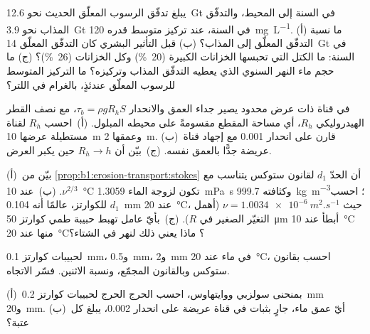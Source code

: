 \begin{exercise}[$\star$]\label{exo:b1:erosion-transport:4}
يبلغ تدفّق الرسوب المعلّق الحديث نحو \qty{12.6}{Gt} في السنة إلى المحيط، والتدفّق المذاب نحو \qty{3.9}{Gt} في السنة، عند تركيز متوسط قدره \qty{120}{mg.L^{-1}}. (أ) ما نسبة التدفّق المعلّق إلى المذاب؟ (ب) قبل التأثير البشري كان التدفّق المعلّق \qty{14}{Gt} في السنة: ما الكتل التي تحبسها الخزانات الكبيرة (\qty{20}{\percent}) وكل الخزانات (\qty{26}{\percent})؟ (ج) ما حجم ماء النهر السنوي الذي يعطيه التدفّق المذاب وتركيزه؟ ما التركيز المتوسط للرسوب المعلّق عندئذٍ، بالغرام في اللتر؟
\end{exercise}

\begin{exercise}[$\star\star$]\label{exo:b1:erosion-transport:5}
في قناة ذات عرض محدود يصير جداء العمق والانحدار $\tau_b =
\rho g R_h S$، مع نصف القطر الهيدروليكي $R_h$، أي مساحة المقطع مقسومةً على محيطه المبلول. (أ)~احسب $R_h$ لقناة مستطيلة عرضها \qty{10}{m} وعمقها \qty{2}{m}. (ب)~قارن  على انحدار \num{0.001} مع إجهاد قناة عريضة جدًّا بالعمق نفسه. (ج)~بيّن أن $R_h \to h$ حين يكبر العرض.
\end{exercise}

\begin{exercise}[$\star\star$]\label{exo:b1:erosion-transport:6}
(أ)~بيّن من \cref{prop:b1:erosion-transport:stokes} أن الحدّ $d_1$ لقانون ستوكس يتناسب مع $\nu^{2/3}$. (ب)~عند \qty{10}{\celsius} تكون لزوجة الماء \qty{1.3059}{mPa.s} وكثافته \qty{999.7}{kg.m^{-3}}؛ احسب $d_1$ للكوارتز، عالمًا أنه \qty{0.104}{mm} عند \qty{20}{\celsius}، حيث $\nu = \qty{1.0034e-6}{m^2.s^{-1}}$ (أهمل التغيّر الصغير في $R$). (ج)~بأيّ عامل تهبط حبيبة طمي كوارتز \qty{50}{\micro m} أبطأ عند \qty{10}{\celsius} منها عند \qty{20}{\celsius}؟ ماذا يعني ذلك لنهر في الشتاء؟
\end{exercise}

\begin{exercise}[$\star\star$]\label{exo:b1:erosion-transport:7}
لحبيبات كوارتز \qty{0.1}{mm}، و\qty{0.5}{mm}، و\qty{2}{mm} في ماء عند \qty{20}{\celsius}، احسب  بقانون ستوكس وبالقانون المجمّع، ونسبة الاثنين. فسّر الاتجاه.
\end{exercise}

\begin{exercise}[$\star\star$]\label{exo:b1:erosion-transport:8}
(أ)~بمنحنى سولزبي ووايتهاوس، احسب  الحرج  الحرج لحبيبات كوارتز \qty{0.2}{mm} و\qty{20}{mm}. (ب)~أيّ عمق ماء، جارٍ بثبات في قناة عريضة على انحدار \num{0.002}، يبلغ كل عتبة؟
\end{exercise}

